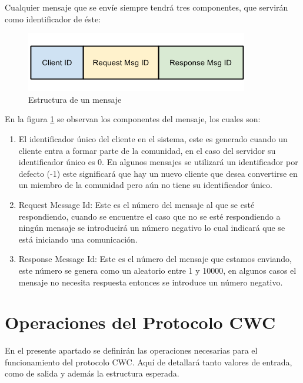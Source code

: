 Cualquier mensaje que se envíe siempre tendrá tres componentes, que servirán como identificador de éste:

\begin{figure}[h]
  \centering
    \includegraphics[scale=0.75]{gfx/EstructuraMensajeCWC}
  \caption{Estructura de un mensaje}
  \label{EstructuraMensajeCWC}
\end{figure}


En la figura \ref{EstructuraMensajeCWC} se observan los componentes del mensaje, los cuales son:

\begin{enumerate}
\item El identificador único del cliente en el sistema, este es generado cuando un cliente entra a formar parte de la comunidad, en el caso del servidor su identificador único es 0. En algunos mensajes se utilizará un identificador por defecto (-1) este significará que hay un nuevo cliente que desea convertirse en un miembro de la comunidad pero aún no tiene su identificador único.

\item Request Message Id: Este es el número del mensaje al que se esté respondiendo, cuando se encuentre el caso que no se esté respondiendo a ningún mensaje se introducirá un número negativo lo cual indicará que se está iniciando una comunicación.

\item Response Message Id: Este es el número del mensaje que estamos enviando, este número se genera como un aleatorio entre 1 y 10000, en algunos casos el mensaje no necesita respuesta entonces se introduce un número negativo.
\end{enumerate}


\section{Operaciones del Protocolo CWC}

En el presente apartado se definirán las operaciones necesarias para el funcionamiento del protocolo CWC. Aquí de detallará tanto valores de entrada, como de salida y además la estructura esperada. 

